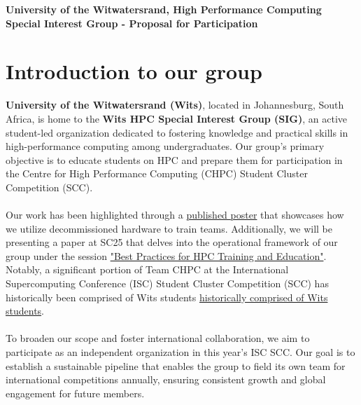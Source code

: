 \documentclass[10pt, onecolumn]{IEEEtran}
\begin{document}
\pagestyle{fancy}
\renewcommand{\headrulewidth}{0pt}
\renewcommand{\footrulewidth}{0pt}
\begin{center}
    \LARGE{\textbf{University of the Witwatersrand, High Performance Computing Special Interest Group - Proposal for Participation}}
    \\
\end{center}
\vspace{0.3cm}
  
\renewenvironment{abstract}
 {\par\noindent\textbf{\abstractname:}\ \ignorespaces}
 {\par\medskip}
\section{Introduction to our group}
\noindent
{} \textbf{University of the Witwatersrand (Wits)}, located in Johannesburg, South Africa, is home to the \textbf{Wits HPC Special Interest Group (SIG)}, an active student-led organization dedicated to fostering knowledge and practical skills in high-performance computing among undergraduates. Our group’s primary objective is to educate students on HPC and prepare them for participation in the Centre for High Performance Computing (CHPC) Student Cluster Competition (SCC). 
\\\\
Our work has been highlighted through a \href{https://dl.acm.org/doi/10.1145/3626203.3670573}{published poster} that showcases how we utilize decommissioned hardware to train teams. Additionally, we will be presenting a paper at SC25 that delves into the operational framework of our group under the session \href{https://sc24.conference-program.com/session/?sess=sess752#:~:text=From%20Student%20SIG,PooleDavid%20Macleod} {"Best Practices for HPC Training and Education"}. Notably, a significant portion of Team CHPC at the International Supercomputing Conference (ISC) Student Cluster Competition (SCC) has historically been comprised of Wits students \href{https://witshpc.com}{historically comprised of Wits students}. 
\\\\
To broaden our scope and foster international collaboration, we aim to participate as an independent organization in this year’s ISC SCC. Our goal is to establish a sustainable pipeline that enables the group to field its own team for international competitions annually, ensuring consistent growth and global engagement for future members.
\end{document}
